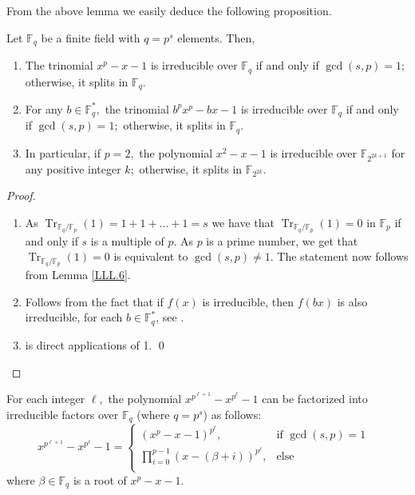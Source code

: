 \documentclass[12pt]{elsarticle}
\def\dprod #1#2{\displaystyle{\prod_{#1}^{#2}}}
\newcommand{\Fq}{\mathbb{F}_{q}}
\DeclareMathOperator{\Tr}{Tr}
\theoremstyle{break}
{\theorembodyfont{\upshape}
    \newtheorem{theorem}{Theorem}[section] %
    \newtheorem{lemma}[theorem]{Lemma} %
    \newtheorem{proposition}[theorem]{Proposition}
    \newtheorem{corollary}[theorem]{Corollary}
    \newtheorem{definition}[theorem]{Definition}
    \newtheorem{example}[theorem]{Example}
    \newtheorem{remark}[theorem]{Remark}
    \newtheorem{conjecture}[theorem]{Conjecture}
    \newtheorem*{proof}{{Proof}}
	\newtheorem*{notation}{Notation}
	\newtheorem*{main}{Cain Theorem}
	\newtheorem*{problem}{Problem}
}
\begin{document}
From the above lemma we easily deduce the following proposition.
\begin{proposition}\label{PP.3}
Let $\Fq$ be a finite field with $q=p^s$ elements. Then,
\begin{enumerate}
    \item The trinomial $x^p-x-1$ is irreducible over $\Fq$ if and only if $ \gcd(s,p)=1;$ otherwise, it splits in $\mathbb{F}_q$. 
    \item For any $b\in \Fq^*,$  the trinomial $b^px^p-bx-1$ is irreducible over $\Fq$ if and only if $ \gcd(s,p)=1;$ otherwise, it splits in $\mathbb{F}_q$.
    \item In particular, if $p=2, $  the polynomial $x^2-x-1$ is irreducible over $\mathbb{F}_{2^{2k+1} }$  for any  positive integer $k;$ otherwise, it splits in $\mathbb{F}_{2^{2k} }.$
\end{enumerate}
    
\end{proposition}
\begin{proof}
\begin{enumerate}
    \item  As  $\Tr_{\Fq/\mathbb{F}_p}(1)= 1+1+\ldots + 1= s$ we have that  $\Tr_{\Fq/\mathbb{F}_p}(1)=0$ in $\mathbb{F}_p$ if and only if $ s$  is a multiple of $p$. As $p$ is a prime number, we get that $\Tr_{\Fq/\mathbb{F}_p}(1)= 0$ is equivalent to $ \gcd(s,p)\neq 1$. The statement now follows from Lemma \ref{LLL.6}.
    \item Follows from the fact that if $f(x)$ is irreducible, then  $ f(bx)$ is also irreducible, for each $b\in \Fq^*$, see \cite[p. 121]{Lidl1987}.
    \item[3.] is direct applications of  1. 
    \qed
    \end{enumerate}
\end{proof}

\begin{corollary}\label{Cor.3}
For each integer $\ell,$ the polynomial $ x^{p^{\ell+1}} - x^{p^{\ell}} - 1 $ can be factorized into irreducible factors over $\mathbb{F}_q$ (where $ q=p^s$) as follows:
  $$
  x^{p^{\ell+1}} - x^{p^{\ell}} - 1 =
  \begin{cases}
  \left( x^p - x - 1 \right)^{p^{\ell}}, & \text{if $\gcd(s,p)=1$ }\\
  \dprod{i=0}{p-1} (x-(\beta+i))^{p^{\ell}}, & \text{else }\\
  \end{cases}
  $$
where $ \beta\in \Fq$ is a root of $ x^p - x - 1.$
\end{corollary}
\end{document}
